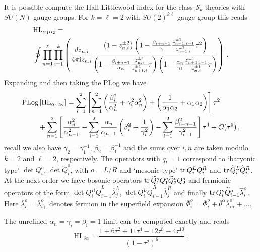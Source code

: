 \documentclass[main.tex]{subfiles}
\begin{document}
It is possible compute the Hall-Littlewood index for the class $\mathcal{S}_k$ theories with $SU(N)$ gauge groups. For $k=\ell=2$ with $SU(2)^{k\ell}$ gauge group this reads
\begin{equation}
\begin{aligned}
&\textrm{HL}_{\alpha_1\alpha_2} =\\
&\oint\prod_{n=1}^{\ell}\prod_{i=1}^k\left(\frac{dz_{n,i}}{4\pi\mathrm{i} z_{n,i}}\frac{\left(1-z_{n,i}^{\pm2}\right)\left(1-\frac{\beta_{i+n-1}}{\gamma_i}\frac{z_{n+1,i-1}^{\pm1}}{z_{n+1,i}^{\pm1}}\tau^2\right)}{\left(1-\frac{\beta_{i+n-1}}{\alpha_n}\frac{z_{n,i}^{\pm1}}{z_{n+1,i}^{\pm1}}\tau\right)\left(1-\frac{\alpha_n}{\gamma_i}\frac{z_{n+1,i-1}^{\pm1}}{z_{n,i}^{\pm1}}\tau\right)}\right)\,.
\end{aligned}
\end{equation}
Expanding and then taking the PLog we have
\begin{equation}
\begin{aligned}
\operatorname{\mathrm{PLog}}&\left[\textrm{HL}_{\alpha_1\alpha_2}\right]=\sum_{i=1}^2\left[\sum_{n=1}^2\left(\frac{\beta_i^2}{\alpha_n ^2}+\gamma_i^2\alpha_n ^2\right)+\left(\frac{1}{\alpha_1  \alpha_2 }+ \alpha_1\alpha_2\right) \right]\tau^2\\
 &+\sum_{n=1}^2\left[\frac{\alpha_n ^2}{\alpha_{n-1} ^2}-\sum_{i=1}^2\frac{\alpha_n}{\alpha_{n-1}}\left(\beta_i^2+\frac{1}{\gamma^{2}_i}\right)-\sum_{i=1}^2\frac{\beta_{i+n-1}^2}{\gamma_{i-1}^2}\right]\tau^4+\mathcal{O}(\tau^6)\,,
\end{aligned}
\end{equation}
recall we also have $\gamma_2=\gamma_1^{-1}$, $\beta_2=\beta_1^{-1}$ and the sums over $i,n$ are taken modulo $k=2$ and $\ell=2$, respectively. The operators with $q_t=1$ correspond to `baryonic type' $\det Q_{i}^{o}$, $\det \widetilde{Q}_{i}^{o}$, with $o=L/R$ and `mesonic type' $\operatorname{tr} Q_{i}^{L}Q_{i}^{R}$ and $\operatorname{tr} \widetilde{Q}_{i}^{L}\widetilde{Q}_{i}^{R}$. At the next order we have bosonic operators $\operatorname{tr}\widetilde{Q}_1^{o}Q_1^{o}\widetilde{Q}_2^{o}Q_2^o$ and fermionic operators of the form $\det Q_i^R\widetilde{Q}_{i-1}^L\overline{\lambda}_j^L$, $\det Q_i^L\widetilde{Q}_{i-1}^R\overline{\lambda}_j^R$ and finally $\operatorname{tr} Q_i^o\widetilde{Q}_{i-1}^o\overline{\lambda}_i^o$. Here $\overline{\lambda}_i^o=\overline{\lambda}^o_{i\dot+}$ denotes fermion in the superfield expansion $\overline{\Phi}^o_i=\overline{\Phi}^o_i+\overline{\theta}^{\dot\alpha}\overline{\lambda}^o_{i\dot\alpha}+\dots$. 

The unrefined $\alpha_n=\gamma_i=\beta_i=1$ limit can be computed exactly and reads
\begin{equation}
\textrm{HL}_{\delta\alpha}=\frac{1+6\tau^2+11\tau^4-12\tau^8-4\tau^{10}}{(1-\tau^2)^6}\,.
\end{equation}
\end{document}
